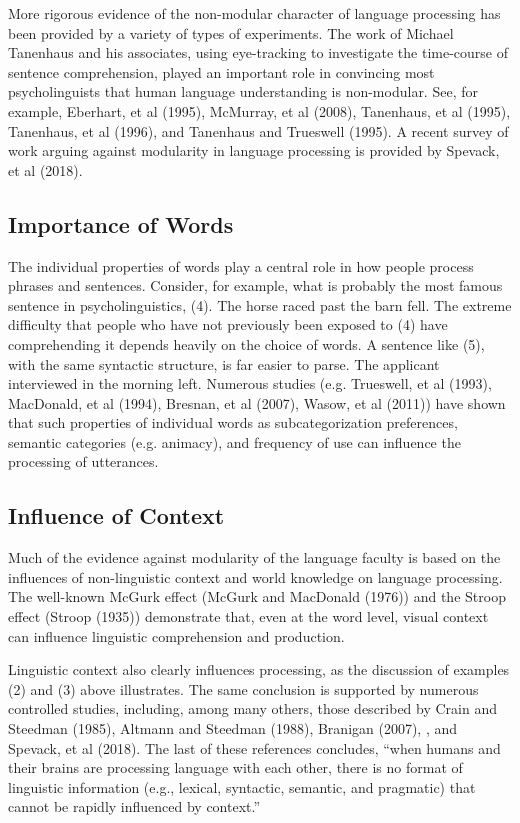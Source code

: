 \documentclass[a4paper]{article}
\begin{document}
More rigorous evidence of the non-modular character of language processing has been provided by a variety of types of experiments.  The work of Michael Tanenhaus and his associates, using eye-tracking to investigate the time-course of sentence comprehension, played an important role in convincing most psycholinguists that human language understanding is non-modular.  See, for example, Eberhart, et al (1995), McMurray, et al (2008), Tanenhaus, et al (1995), Tanenhaus, et al (1996), and Tanenhaus and Trueswell (1995). A recent survey of work arguing against modularity in language processing is provided by Spevack, et al (2018).  

\subsection{Importance of Words}

The individual properties of words play a central role in how people process phrases and sentences.  Consider, for example, what is probably the most famous sentence in psycholinguistics, (4).
\ea
The horse raced past the barn fell.
\z
The extreme difficulty that people who have not previously been exposed to (4) have comprehending it depends heavily on the choice of words.  A sentence like (5), with the same syntactic structure, is far easier to parse.
\ea
The applicant interviewed in the morning left.
\z
Numerous studies (e.g. Trueswell, et al (1993), MacDonald, et al (1994), Bresnan, et al (2007), Wasow, et al (2011))  have shown that such properties of individual words as subcategorization preferences, semantic categories (e.g. animacy), and frequency of use can influence the processing of utterances.  

\subsection{Influence of Context}

Much of the evidence against modularity of the language faculty is based on the influences of non-linguistic context and world knowledge on language processing.  The well-known McGurk effect (McGurk and MacDonald (1976)) and the Stroop effect (Stroop (1935)) demonstrate that, even at the word level, visual context can influence linguistic comprehension and production.

Linguistic context also clearly influences processing, as the discussion of examples (2) and (3)
above illustrates.  The same conclusion is supported by numerous controlled studies, including,
among many others, those described by Crain and Steedman (1985), Altmann and Steedman (1988),
Branigan (2007), \citet{TraxlerTooley2007a}, and Spevack, et al (2018).  The last of these references concludes, ``when humans and their brains are processing language with each other, there is no format
of linguistic information (e.g., lexical, syntactic, semantic, and pragmatic) that cannot be rapidly
influenced by context.''
\end{document}
